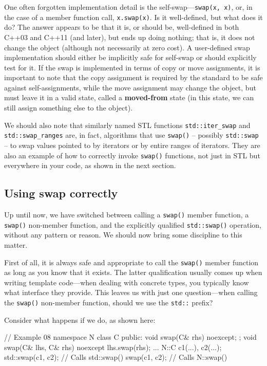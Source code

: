 One often forgotten implementation detail is the self-swap---\texttt{swap(x,\ x)}, or, in the case of a member function call, \texttt{x.swap(x)}. Is it well-defined, but what does it do? The answer appears to be that it is, or should be, well-defined in both C++03 and C++11 (and later), but ends up doing nothing; that is, it does not change the object (although not necessarily at zero cost). A user-defined swap implementation should either be implicitly safe for self-swap or should explicitly test for it. If the swap is implemented in terms of copy or move assignments, it is important to note that the copy assignment is required by the standard to be safe against self-assignments, while the move assignment may change the object, but must leave it in a valid state, called a \textbf{moved-from} state (in this state, we can still assign something else to the object).

We should also note that similarly named STL functions \texttt{std::iter\_swap} and \texttt{std::swap\_ranges} are, in fact, algorithms that use \texttt{swap()} -- possibly \texttt{std::swap} -- to swap values pointed to by iterators or by entire ranges of iterators. They are also an example of how to correctly invoke \texttt{swap()} functions, not just in STL but everywhere in your code, as shown in the next section.

\subsection{Using swap correctly}

Up until now, we have switched between calling a \texttt{swap()} member function, a \texttt{swap()} non-member function, and the explicitly qualified \texttt{std::swap()} operation, without any pattern or reason. We should now bring some discipline to this matter.

First of all, it is always safe and appropriate to call the \texttt{swap()} member function as long as you know that it exists. The latter qualification usually comes up when writing template code---when dealing with concrete types, you typically know what interface they provide. This leaves us with just one question---when calling the \texttt{swap()} non-member function, should we use the \texttt{std::} prefix?

Consider what happens if we do, as shown here:

\begin{code}
// Example 08
namespace N {
  class C {
    public:
    void swap(C& rhs) noexcept;
  };
  void swap(C& lhs, C& rhs) noexcept { lhs.swap(rhs); }
}
...
N::C c1(...), c2(...);
std::swap(c1, c2);    // Calls std::swap()
swap(c1, c2);        // Calls N::swap()
\end{code}

